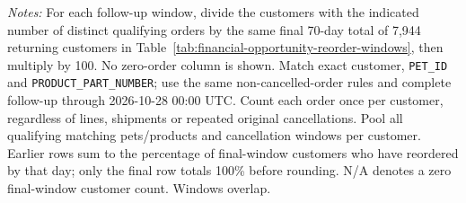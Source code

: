 \begin{table}[!htbp]
\begin{minipage}{\linewidth}
\footnotesize
\textit{Notes:} For each follow-up window, divide the customers with the indicated
number of distinct qualifying orders by the same final 70-day total of 7,944 returning
customers in Table~\ref{tab:financial-opportunity-reorder-windows}, then multiply by 100.
No zero-order column is shown. Match exact customer,
\texttt{PET\_ID} and \texttt{PRODUCT\_PART\_NUMBER}; use the same non-cancelled-order
rules and complete follow-up through 2026-10-28 00:00 UTC.
Count each order once per customer, regardless of lines, shipments or repeated
original cancellations. Pool all qualifying matching pets/products and
cancellation windows per customer. Earlier rows sum to the percentage of final-window customers who have reordered by that day; only the final row totals 100\% before rounding.
N/A denotes a zero final-window customer count. Windows overlap.
\end{minipage}
\end{table}
